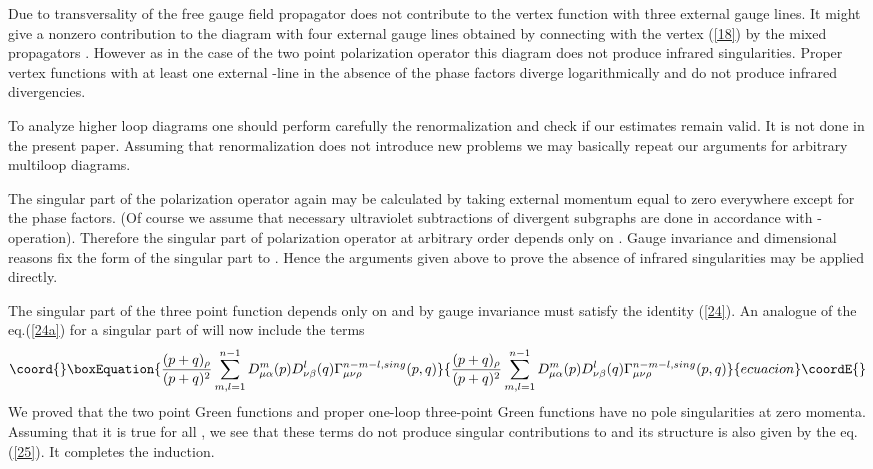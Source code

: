 \documentclass[a4paper,12pt]{article}
\begin{document}
 Due to transversality of the free gauge field propagator \coordHE{} does not contribute to the vertex function with 
  three external gauge lines. It might give a nonzero contribution to the 
  diagram with four external gauge lines obtained by connecting 
  \coordHE{} with the vertex (\ref{18}) by the 
  mixed propagators \coordHE{}. However as in the case of the 
  two point polarization operator this diagram does not produce 
  infrared singularities. 
  Proper vertex functions with at least one external \myHighlight{$\lambda$}\coordHE{}-line in 
  the absence of the phase factors diverge logarithmically and do 
  not produce infrared divergencies.
  
To analyze higher loop diagrams one should perform carefully the
renormalization and check if our estimates remain valid. It is not done 
in the present paper. Assuming that renormalization does not introduce new 
problems we may basically repeat our arguments for arbitrary multiloop 
diagrams.

 The singular part of the polarization operator again may be 
calculated by taking external momentum equal to zero everywhere except for 
the phase factors.  (Of course we assume that necessary ultraviolet 
subtractions of divergent subgraphs are done in accordance with 
\coordHE{}-operation). Therefore the singular part of polarization operator at 
arbitrary order depends only on \coordHE{}.  Gauge invariance and 
dimensional reasons fix the form of the singular part to \coordHE{}.  Hence the arguments given above to 
prove the absence of infrared singularities may be applied directly.

The singular part of the three point function depends only on \coordHE{} and by gauge invariance must satisfy the identity (\ref{24}). 
An analogue of the eq.(\ref{24a}) for a singular part of \coordHE{} will now include the terms
\begin{equation}\coord{}\boxEquation{ 
\frac{(p+q)_{\rho}}{(p+q)^2} \sum_{m,l=1}^{n-1}D_{\mu \alpha}^m(p)D_{\nu 
\beta}^l(q) \Gamma_{\mu \nu \rho}^{n-m-l, sing}(p,q) 
 \label{26} 
 }{ 
\frac{(p+q)_{\rho}}{(p+q)^2} \sum_{m,l=1}^{n-1}D_{\mu \alpha}^m(p)D_{\nu 
\beta}^l(q) \Gamma_{\mu \nu \rho}^{n-m-l, sing}(p,q) 
 }{ecuacion}\coordE{}\end{equation} 
  We proved that the two point Green functions and proper 
one-loop three-point Green functions have no pole singularities at zero 
momenta.  Assuming that it is true for 
all \coordHE{}, we see that these terms do not produce singular contributions 
to \coordHE{} and its structure is also given by the 
eq.(\ref{25}). It completes the induction.
\end{document}
